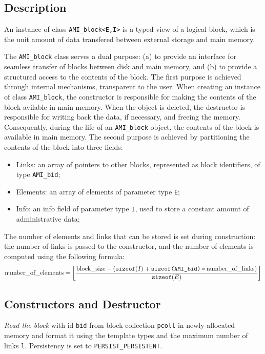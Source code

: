    \etabb

\subsection{Description}

An instance of class {\tt AMI\_block<E,I>} is a typed
view of a logical block, which is the unit amount of data transfered
between external storage and main memory. 

The {\tt AMI\_block} class serves a dual purpose: (a) to provide an
interface for seamless transfer of blocks between disk and main memory,
and (b) to provide a structured access to the contents of the block.
The first purpose is achieved through internal mechanisms, transparent
to the user. When creating an instance of class {\tt AMI\_block}, the
constructor is responsible for making the contents of the block
avilable in main memory. When the object is deleted, the destructor is
responsible for writing back the data, if necessary, and freeing the
memory. Consequently, during the life of an {\tt AMI\_block} object, the
contents of the block is available in main memory.
The second purpose is achieved by partitioning the contents of the block
into three fields:
\begin{itemize}
\item[] Links: an array of pointers to other blocks, represented as
block identifiers, of type {\tt AMI\_bid};
\item[] Elements: an array of elements of parameter type {\tt E};
\item[] Info: an info field of parameter type {\tt I}, used to store a 
constant amount of administrative data;
\end{itemize}

The number of elements and links that can be stored is set during
construction: the number of links is passed to the constructor, and the
number of elements is computed using the following formula:
\[\mbox{\rm number\_of\_elements} = \left\lfloor\frac{\mbox{\rm
block\_size} - (\mbox{\tt sizeof}(I) + \mbox{\tt sizeof(AMI\_bid)} *
\mbox{\rm number\_of\_links})}{\mbox{\tt sizeof}(E)}\right\rfloor \]

\subsection{Constructors and Destructor}

   \btabb 

	 {{\em Read the block} with id {\tt bid} from block collection
	{\tt *pcoll} in newly allocated memory and format it using the
	template types and the maximum number of links {\tt l}. Persistency
	is set to {\tt PERSIST\_PERSISTENT}.}

